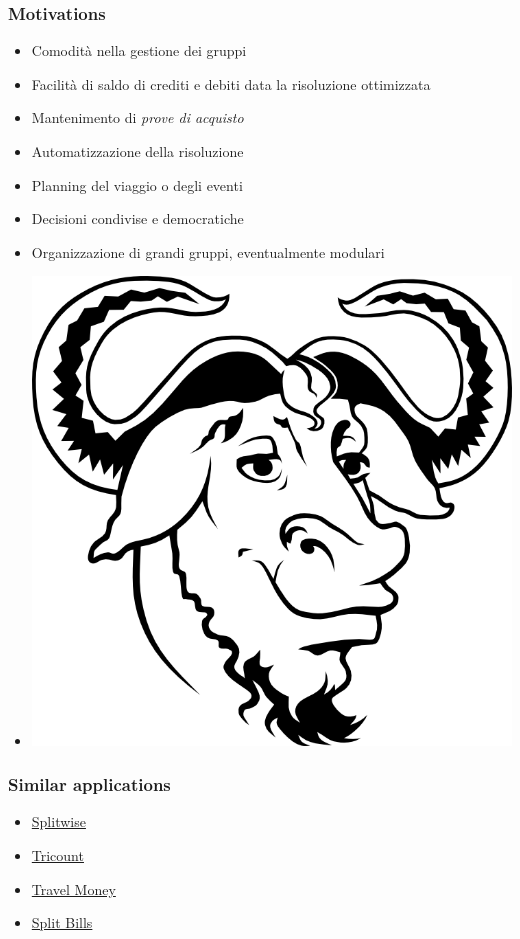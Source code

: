 \documentclass[11pt]{beamer}
\begin{document}
	\begin{frame}
		\frametitle{Motivations}
		
		\begin{itemize}
			\item Comodità nella gestione dei gruppi
			\item Facilità di saldo di crediti e debiti data la risoluzione ottimizzata
			\item Mantenimento di \textit{prove di acquisto}
			\item Automatizzazione della risoluzione
			\item Planning del viaggio o degli eventi
			\item Decisioni condivise e democratiche
			\item Organizzazione di grandi gruppi, eventualmente modulari
			\item[] \includegraphics[width=.1\linewidth]{gnu.png}
		\end{itemize}
	\end{frame}

	\begin{frame}
		\frametitle{Similar applications}
		
		\begin{itemize}
			\item \href{https://play.google.com/store/apps/details?id=com.Splitwise.SplitwiseMobile&hl=en_US&gl=US}{Splitwise}
			\item \href{https://play.google.com/store/apps/details?id=com.tribab.tricount.android}{Tricount}
			\item \href{https://play.google.com/store/apps/details?id=org.marbot.travel.money.free}{Travel Money}
			\item \href{https://play.google.com/store/apps/details?id=com.jwang123.splitbills}{Split Bills}
		\end{itemize}
	\end{frame}
\end{document}
